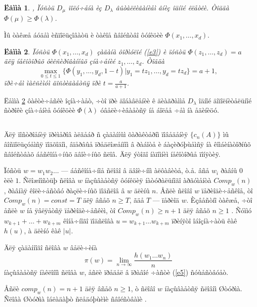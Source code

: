 \documentclass{article}
\numberwithin{equation}{section}
\theoremstyle{plain}
\newtheorem{lemma}{Ëåììà}[section]
\theoremstyle{definition}
\begin{document}
\begin{fulltext}
\begin{lemma}\label{L2}\cite[ëåììà 3]{GZ6}, \cite[ëåììà 2]{ZR}
Ïóñòü $D_\mu$ ïîëó÷åíà èç $D_\lambda$ âûòàëêèâàíèåì âíèç îäíîé êëåòêè. Òîãäà
$\Phi(\mu) \ge \Phi(\lambda)$.
\end{lemma}

Ìû òàêæå áóäåì èñïîëüçîâàòü è òàêîå ñâîéñòâî ôóíêöèè $\Phi(x_1,\ldots,x_d)$.

\begin{lemma}\label{L3}\cite[ëåììà 2]{RZ}
Ïóñòü $\Phi(x_1,\ldots,x_d)$ çàäàíà ôîðìóëîé (\ref{e3}) è ïóñòü
$\Phi(z_1,\ldots,z_d)=a$ äëÿ íåêîòîðûõ ôèêñèðîâàííûõ çíà÷åíèé $z_1,\ldots,z_d$. Òîãäà
$$
\max_{0\le t \le 1}\{\Phi(y_1,\ldots,y_d,1-t)|y_1=tz_1,\ldots,y_d=tz_d \}=a+1,
$$
ïðè÷åì ìàêñèìóì äîñòèãàåòñÿ ïðè $t=\frac{a}{a+1}$.
\end{lemma}

Ëåììà \ref{L3} ôàêòè÷åñêè îçíà÷àåò, ÷òî ïðè äîáàâëåíèè ê äèàãðàììå $D_\lambda$ îäíîé
äîïîëíèòåëüíîé ñòðîêè çíà÷åíèå ôóíêöèè $\Phi(\lambda)$ óâåëè÷èâàåòñÿ íå áîëåå
÷åì íà åäèíèöó.

 
 \subsection{}\label{s2.4}
 Äëÿ ïîñòðîåíèÿ ïðèìåðîâ àëãåáð ñ çàäàííûì õàðàêòåðîì ïîâåäåíèÿ $\{c_n(A)\}$ ìû
 âîñïîëüçóåìñÿ ïîäõîäîì, âïåðâûå ïðåäëîæåííîì â ðàáîòå \cite{GMZ} è áàçèðóþùåìñÿ íà êîìáèíàòîðíûõ ñâîéñòâàõ áåñêîíå÷íûõ äâîè÷íûõ ñëîâ. Äëÿ ýòîãî íàïîìíèì íåêîòîðûå
 ïîíÿòèÿ.
 
 Ïóñòü $w=w_1w_2\ldots$ --- áåñêîíå÷íîå ñëîâî â äâîè÷íîì àëôàâèòå, ò.å. âñå $w_i$ ðàâíû
 $0$ èëè $1$. Ñëîæíîñòüþ ñëîâà $w$ íàçûâàåòñÿ ôóíêöèÿ íàòóðàëüíîãî àðãóìåíòà $Comp_w(n)$,
 ðàâíàÿ êîëè÷åñòâó ðàçëè÷íûõ ïîäñëîâ â $w$ äëèíû $n$. Åñëè ñëîâî $w$ ïåðèîäè÷åñêîå, òî
 $Comp_w(n)=const=T$ äëÿ âñåõ $n\ge T$, ãäå $T$ --- ïåðèîä $w$. Èçâåñòíî òàêæå, ÷òî åñëè $w$
 íå ÿâëÿåòñÿ ïåðèîäè÷åñêèì, òî $Comp_w(n) \ge n+1$ äëÿ âñåõ $n\ge 1$ \cite{L}. Ñóììó
 $w_{k+1}+\ldots+w_{k+m}$ êîíå÷íîãî ïîäñëîâà $u=w_{k+1}\ldots w_{k+m}$ ïðèíÿòî îáîçíà÷àòü êàê
 $h(u)$, à äëèíó êàê $|u|$.
 
Äëÿ çàäàííîãî ñëîâà $w$ âåëè÷èíà
\begin{equation} \label{e5}
\pi(w)=\lim_{n\to\infty} \frac{h(w_1\ldots w_n)}{n}
\end{equation}
íàçûâàåòñÿ íàêëîíîì ñëîâà $w$, åñëè ïðåäåë â ïðàâîé ÷àñòè (\ref{e5}) ñóùåñòâóåò.

Åñëè $comp_w(n)=n+1$ äëÿ âñåõ $n\ge 1$, ò ñëîâî $w$ íàçûâàåòñÿ ñëîâîì Øòóðìà. Ñëîâà Øòóðìà îáëàäàþò ñëåäóþùèìè 
ñâîéñòâàìè \cite{L}.


\end{fulltext}
\end{document}
